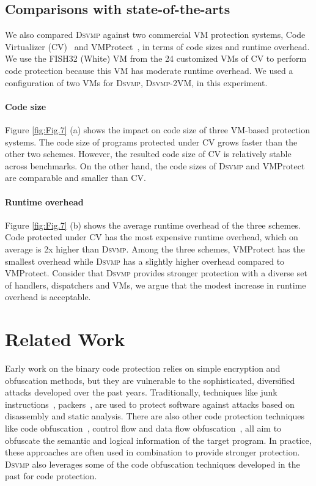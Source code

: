 \documentclass[conference]{IEEEtran}
\newcommand{\DSVMP}{\textsc{Dsvmp}\xspace}
\begin{document}
\subsection{Comparisons with state-of-the-arts}
We also compared \DSVMP against two commercial VM protection systems, Code Virtualizer (CV)~\cite{2CV} and VMProtect~\cite{3Vmprotect}, in terms of code sizes and runtime overhead.
We use the FISH32 (White) VM from the 24 customized VMs of CV to perform code protection because this VM has moderate runtime overhead. We used a configuration of two VMs for \DSVMP, \DSVMP-2VM, in this experiment.

\paragraph*{Code size} Figure \ref{fig:Fig.7} (a) shows the impact on code size of three VM-based protection systems. The code size of programs protected under CV grows faster than the other two schemes. However, the resulted code size of CV is relatively stable across benchmarks. On the other hand, the code sizes of \DSVMP and VMProtect are comparable and smaller than CV.


\paragraph*{Runtime overhead}
Figure \ref{fig:Fig.7} (b) shows the average runtime overhead of the three schemes. Code protected under CV has the most expensive runtime overhead, which on average is 2x higher than \DSVMP. Among the three schemes, VMProtect has the smallest overhead while \DSVMP has a slightly higher overhead compared to VMProtect.
Consider that \DSVMP provides stronger protection with a diverse set of handlers, dispatchers and VMs, we argue that the modest increase in runtime overhead is acceptable.


\section{Related Work}
Early work on the binary code protection relies on simple encryption and obfuscation methods, but they are vulnerable to the sophisticated, diversified attacks developed over the past years.
Traditionally, techniques like junk instructions~\cite{23linn2003obfuscation}, packers~\cite{25Execryptor,26upx}, are used to protect software against attacks based on disassembly and static analysis.
There are also other code protection techniques like code obfuscation~\cite{25wu2010mimimorphism}, control flow and data flow obfuscation~\cite{13liem2008compiler,27ge2005control,27balachandran2014function},  all aim to obfuscate the semantic and logical information of the target program.
In practice, these approaches are often used in combination to provide stronger protection. \DSVMP also leverages some of the code obfuscation techniques developed in the past for code protection.
\end{document}
